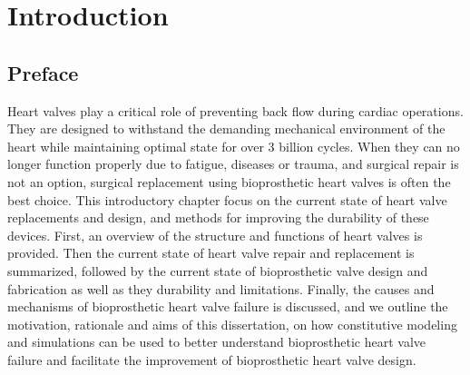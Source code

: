 \chapter{Introduction} %

\section*{Preface}
%

    Heart valves play a critical role of preventing back flow during cardiac operations. They are designed to withstand the demanding mechanical environment of the heart while maintaining optimal state for over 3 billion cycles. When they can no longer function properly due to fatigue, diseases or trauma, and surgical repair is not an option, surgical replacement using bioprosthetic heart valves is often the best choice. This introductory chapter focus on the current state of heart valve replacements and design, and methods for improving the durability of these devices. First, an overview of the structure and functions of heart valves is provided. Then the current state of heart valve repair and replacement is summarized, followed by the current state of bioprosthetic valve design and fabrication as well as they durability and limitations. Finally, the causes and mechanisms of bioprosthetic heart valve failure is discussed, and we outline the motivation, rationale and aims of this dissertation, on how constitutive modeling and simulations can be used to better understand bioprosthetic heart valve failure and facilitate the improvement of bioprosthetic heart valve design. 

























